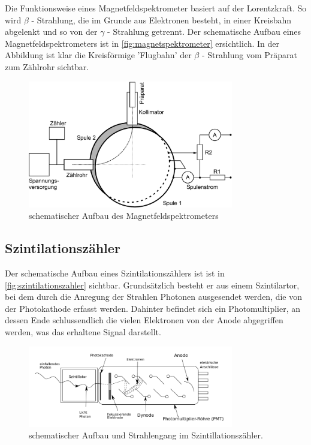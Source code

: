 \documentclass[12pt,english,ngerman]{scrartcl}
\begin{document}
Die Funktionsweise eines Magnetfeldspektrometer basiert auf der Lorentzkraft.
So wird \(\beta\) - Strahlung, die im Grunde aus Elektronen besteht, in einer
Kreisbahn abgelenkt und so von der \(\gamma\) - Strahlung getrennt. Der
schematische Aufbau eines Magnetfeldspektrometers ist in
\autoref{fig:magnetspektrometer} ersichtlich. In der Abbildung ist klar die
Kreisförmige 'Flugbahn' der \(\beta\) - Strahlung vom Präparat zum Zählrohr
sichtbar.\cite[]{demex2}

\begin{figure}[H]
	\begin{center}
		\includegraphics[width = 0.8\textwidth]{./figures/fig5.png}
	\end{center}
	\caption{schematischer Aufbau des
		Magnetfeldspektrometers~\cite[]{zaehlrohrvorbereitung}}\label{fig:magnetspektrometer}
\end{figure}

\subsection{Szintilationszähler}

Der schematische Aufbau eines Szintilationszählers ist ist in
\autoref{fig:szintilationszahler} sichtbar. Grundsätzlich besteht er aus einem
Szintilartor, bei dem durch die Anregung der Strahlen Photonen ausgesendet
werden, die von der Photokathode erfasst werden. Dahinter befindet sich ein
Photomultiplier, an dessen Ende schlussendlich die vielen Elektronen von der
Anode abgegriffen werden, was das erhaltene Signal darstellt.\cite{gerthsen}

\begin{figure}[H]
	\begin{center}
		\includegraphics[width = 0.8\textwidth]{./figures/szintilationszahler.png}
	\end{center}
	\caption{schematischer Aufbau und
		Strahlengang im Szintillationszähler.~\cite[]{zaehlrohrvorbereitung}}\label{fig:szintilationszahler}
\end{figure}
\end{document}
